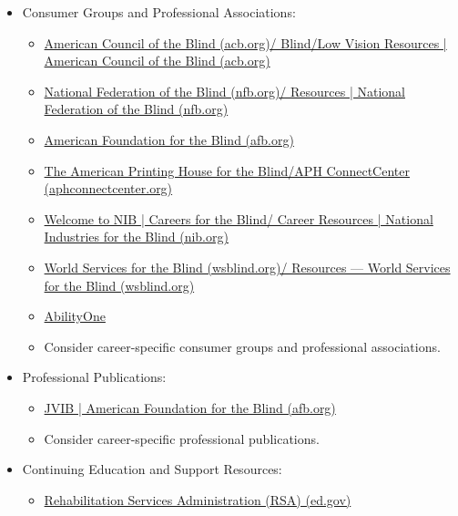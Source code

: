 \begin{itemize}[leftmargin=1.0cm]
	\item Consumer Groups and Professional Associations:
	      \begin{itemize}
		      \item \href{https://www.acb.org/blind-low-vision-resources}{American Council of the Blind (acb.org)/ Blind/Low Vision Resources | American Council of the Blind (acb.org)}
		      \item \href{https://nfb.org/resources}{National Federation of the Blind (nfb.org)/ Resources | National Federation of the Blind (nfb.org)}
		      \item \href{https://www.afb.org/}{American Foundation for the Blind (afb.org)}
		      \item \href{https://aphconnectcenter.org/}{The American Printing House for the Blind/APH ConnectCenter (aphconnectcenter.org)}
		      \item \href{https://www.nib.org/resources/#skip_link_main_content}{Welcome to NIB | Careers for the Blind/ Career Resources | National Industries for the Blind (nib.org)}
		      \item \href{https://www.wsblind.org/resources}{World Services for the Blind (wsblind.org)/ Resources — World Services for the Blind (wsblind.org)}
		      \item \href{https://www.abilityone.gov/}{AbilityOne}
		      \item Consider career-specific consumer groups and professional associations.
	      \end{itemize}
	\item Professional Publications:
	      \begin{itemize}
		      \item \href{https://www.afb.org/news-publications/publications/jvib}{JVIB | American Foundation for the Blind (afb.org)}
		      \item Consider career-specific professional publications.
	      \end{itemize}
	\item Continuing Education and Support Resources:
	      \begin{itemize}
		      \item \href{https://nam11.safelinks.protection.outlook.com/?url=https%3A%2F%2Frsa.ed.gov%2Fabout%2Fstates&data=05%7C01%7Cchris_fendrick%40kernhigh.org%7Cbc7ebcd1034f4b8956c808da4e0886ed%7C79e9a47a04484925bf6638dadfc6f0a4%7C0%7C0%7C637908095803823825%7CUnknown%7CTWFpbGZsb3d8eyJWIjoiMC4wLjAwMDAiLCJQIjoiV2luMzIiLCJBTiI6Ik1haWwiLCJXVCI6Mn0%3D%7C3000%7C%7C%7C&sdata=7Yp0WqYpmUt23krj04UuAfM%2FfPtXDqngbOewfl9go10%3D&reserved=0}{Rehabilitation Services Administration (RSA) (ed.gov)}

\end{itemize}
\end{itemize}
